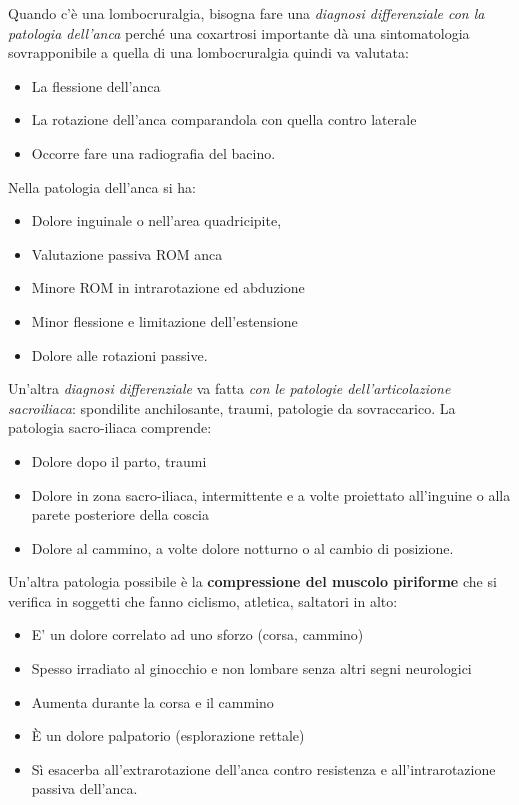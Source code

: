 Quando c'è una lombocruralgia, bisogna fare una \emph{diagnosi
differenziale con la patologia dell'anca} perché una coxartrosi
importante dà una sintomatologia sovrapponibile a quella di una
lombocruralgia quindi va valutata:

\begin{itemize}
\item
  La flessione dell'anca
\item
  La rotazione dell'anca comparandola con quella contro laterale
\item
  Occorre fare una radiografia del bacino.
\end{itemize}

Nella patologia dell'anca si ha:

\begin{itemize}
\item
  Dolore inguinale o nell'area quadricipite,
\item
  Valutazione passiva ROM anca
\item
  Minore ROM in intrarotazione ed abduzione
\item
  Minor flessione e limitazione dell'estensione
\item
  Dolore alle rotazioni passive.
\end{itemize}

Un'altra \emph{diagnosi differenziale} va fatta \emph{con le patologie
dell'articolazione sacroiliaca}: spondilite anchilosante, traumi,
patologie da sovraccarico. La patologia sacro-iliaca comprende:

\begin{itemize}
\item
  Dolore dopo il parto, traumi
\item
  Dolore in zona sacro-iliaca, intermittente e a volte proiettato
  all'inguine o alla parete posteriore della coscia
\item
  Dolore al cammino, a volte dolore notturno o al cambio di posizione.
\end{itemize}

Un'altra patologia possibile è la \textbf{compressione del muscolo
piriforme} che si verifica in soggetti che fanno ciclismo, atletica,
saltatori in alto:

\begin{itemize}
\item
  E' un dolore correlato ad uno sforzo (corsa, cammino)
\item
  Spesso irradiato al ginocchio e non lombare senza altri segni
  neurologici
\item
  Aumenta durante la corsa e il cammino
\item
  È un dolore palpatorio (esplorazione rettale)
\item
  Sì esacerba all'extrarotazione dell'anca contro resistenza e
  all'intrarotazione passiva dell'anca.
\end{itemize}

